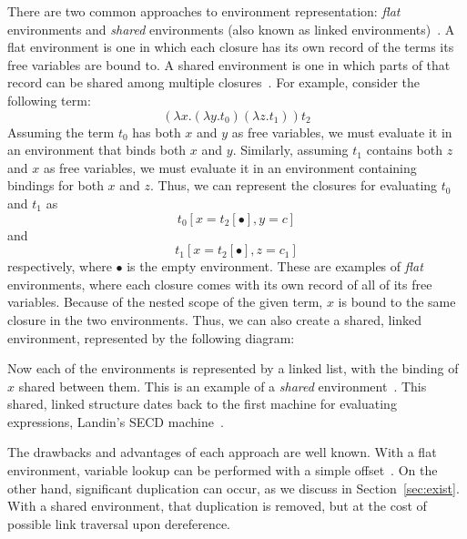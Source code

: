 There are two common approaches to environment representation: \emph{flat}
environments and \emph{shared} environments (also known as linked
environments)~\cite{appel1988optimizing,shao1994space}. A flat environment is
one in which each closure has its own record of the terms its free variables are
bound to. A shared environment is one in which parts of that record can be
shared among multiple closures~\cite{appel1988optimizing,shao1994space}. For
example, consider the following term: $$(\lambda x.(\lambda y.t_0) (\lambda
z.t_1)) t_2$$ Assuming the term $t_0$ has both $x$ and $y$ as free variables, we
must evaluate it in an environment that binds both $x$ and $y$.  Similarly,
assuming $t_1$ contains both $z$ and $x$ as free variables, we must evaluate it
in an environment containing bindings for both $x$ and $z$. Thus, we can
represent the closures for evaluating $t_0$ and $t_1$  as $$t_0[x=t_2[\bullet],
y=c]$$ and $$t_1[x=t_2[\bullet], z=c_1]$$ respectively, where $\bullet$ is the
empty environment.  These are examples of \emph{flat} environments, where each
closure comes with its own record of all of its free variables. Because of the
nested scope of the given term, $x$ is bound to the same closure in the two
environments. Thus, we can also create a shared, linked environment,
represented by the following diagram:

\begin{center}
\end{center}
Now each of the environments is represented by a linked list, with the binding
of $x$ shared between them. This is an example of a \emph{shared}
environment~\cite{appel1988optimizing}. This shared, linked structure dates back
to the first machine for evaluating expressions, Landin's SECD
machine~\cite{landin1964mechanical}.

The drawbacks and advantages of each approach are well known. With a flat
environment, variable lookup can be performed with a simple
offset~\cite{jonesstg,appel1992compiling}. On the other hand, significant
duplication can occur, as we discuss in Section~\ref{sec:exist}.  With a shared
environment, that duplication is removed, but at the cost of possible link
traversal upon dereference. 


